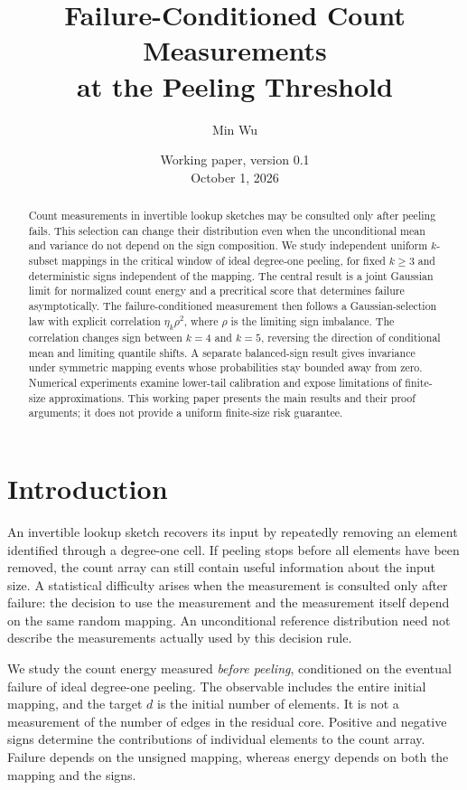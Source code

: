 \documentclass[11pt,a4paper]{article}
\title{Failure-Conditioned Count Measurements\\at the Peeling Threshold}
\author{Min Wu}
\date{Working paper, version 0.1\\October 1, 2026}
\begin{document}
\maketitle
\begin{abstract}
Count measurements in invertible lookup sketches may be consulted only after peeling fails. This selection can change their distribution even when the unconditional mean and variance do not depend on the sign composition. We study independent uniform $k$-subset mappings in the critical window of ideal degree-one peeling, for fixed $k\ge3$ and deterministic signs independent of the mapping. The central result is a joint Gaussian limit for normalized count energy and a precritical score that determines failure asymptotically. The failure-conditioned measurement then follows a Gaussian-selection law with explicit correlation $\eta_k\rho^2$, where $\rho$ is the limiting sign imbalance. The correlation changes sign between $k=4$ and $k=5$, reversing the direction of conditional mean and limiting quantile shifts. A separate balanced-sign result gives invariance under symmetric mapping events whose probabilities stay bounded away from zero. Numerical experiments examine lower-tail calibration and expose limitations of finite-size approximations. This working paper presents the main results and their proof arguments; it does not provide a uniform finite-size risk guarantee.
\end{abstract}

\section{Introduction}
An invertible lookup sketch recovers its input by repeatedly removing an element identified through a degree-one cell. If peeling stops before all elements have been removed, the count array can still contain useful information about the input size. A statistical difficulty arises when the measurement is consulted only after failure: the decision to use the measurement and the measurement itself depend on the same random mapping. An unconditional reference distribution need not describe the measurements actually used by this decision rule.

We study the count energy measured \emph{before peeling}, conditioned on the eventual failure of ideal degree-one peeling. The observable includes the entire initial mapping, and the target $d$ is the initial number of elements. It is not a measurement of the number of edges in the residual core. Positive and negative signs determine the contributions of individual elements to the count array. Failure depends on the unsigned mapping, whereas energy depends on both the mapping and the signs.
\end{document}
